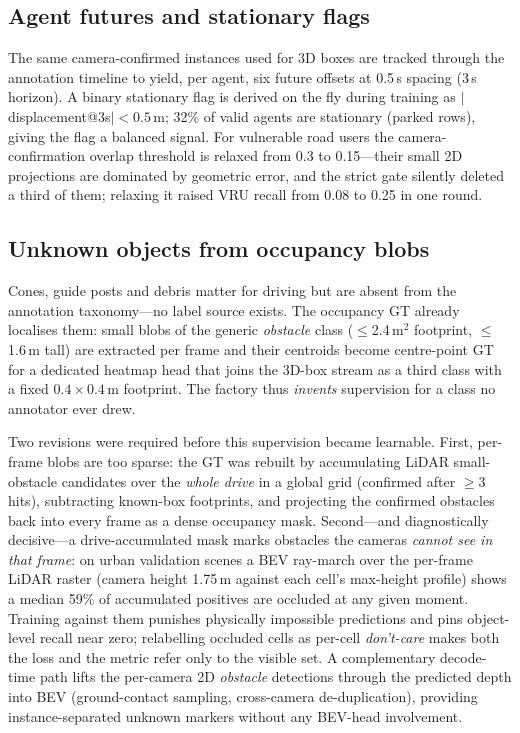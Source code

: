 \documentclass[10pt,twocolumn]{article}
\begin{document}
\subsection{Agent futures and stationary flags}
The same camera-confirmed instances used for 3D boxes are tracked through
the annotation timeline to yield, per agent, six future offsets at
0.5\,s spacing (3\,s horizon). A binary stationary flag is derived on the
fly during training as $|$displacement@3s$|<0.5$\,m; 32\% of valid agents
are stationary (parked rows), giving the flag a balanced signal. For
vulnerable road users the camera-confirmation overlap threshold is relaxed
from 0.3 to 0.15---their small 2D projections are dominated by geometric
error, and the strict gate silently deleted a third of them; relaxing it
raised VRU recall from 0.08 to 0.25 in one round.

\subsection{Unknown objects from occupancy blobs}
Cones, guide posts and debris matter for driving but are absent from the
annotation taxonomy---no label source exists. The occupancy GT already
localises them: small blobs of the generic \emph{obstacle} class
($\le$2.4\,m$^2$ footprint, $\le$1.6\,m tall) are extracted per frame and
their centroids become centre-point GT for a dedicated heatmap head that
joins the 3D-box stream as a third class with a fixed
$0.4{\times}0.4$\,m footprint. The factory thus \emph{invents} supervision
for a class no annotator ever drew.

Two revisions were required before this supervision became learnable.
First, per-frame blobs are too sparse: the GT was rebuilt by accumulating
LiDAR small-obstacle candidates over the \emph{whole drive} in a global
grid (confirmed after $\ge$3 hits), subtracting known-box footprints, and
projecting the confirmed obstacles back into every frame as a dense
occupancy mask. Second---and diagnostically decisive---a drive-accumulated
mask marks obstacles the cameras \emph{cannot see in that frame}: on urban
validation scenes a BEV ray-march over the per-frame LiDAR raster (camera
height 1.75\,m against each cell's max-height profile) shows a median 59\%
of accumulated positives are occluded at any given moment. Training against
them punishes physically impossible predictions and pins object-level
recall near zero; relabelling occluded cells as per-cell \emph{don't-care}
makes both the loss and the metric refer only to the visible set. A
complementary decode-time path lifts the per-camera 2D \emph{obstacle}
detections through the predicted depth into BEV (ground-contact sampling,
cross-camera de-duplication), providing instance-separated unknown markers
without any BEV-head involvement.
\end{document}
